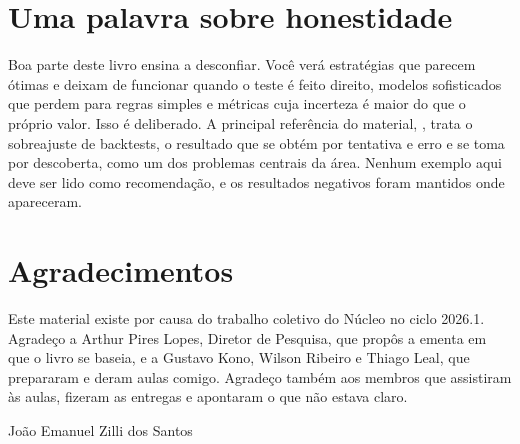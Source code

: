 \section*{Uma palavra sobre honestidade}

Boa parte deste livro ensina a desconfiar. Você verá estratégias que parecem ótimas e deixam de funcionar quando o teste é feito direito, modelos sofisticados que perdem para regras simples e métricas cuja incerteza é maior do que o próprio valor. Isso é deliberado. A principal referência do material, \citet{lopezdeprado2018}, trata o sobreajuste de backtests, o resultado que se obtém por tentativa e erro e se toma por descoberta, como um dos problemas centrais da área. Nenhum exemplo aqui deve ser lido como recomendação, e os resultados negativos foram mantidos onde apareceram.

\section*{Agradecimentos}

Este material existe por causa do trabalho coletivo do Núcleo no ciclo 2026.1. Agradeço a Arthur Pires Lopes, Diretor de Pesquisa, que propôs a ementa em que o livro se baseia, e a Gustavo Kono, Wilson Ribeiro e Thiago Leal, que prepararam e deram aulas comigo. Agradeço também aos membros que assistiram às aulas, fizeram as entregas e apontaram o que não estava claro.

\vspace{6mm}
\noindent João Emanuel Zilli dos Santos
